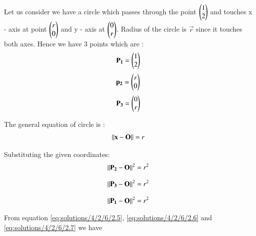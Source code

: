 Let us consider  we have a circle which passes through the point   $ \begin{pmatrix} 1 \\ 2 \\	\end{pmatrix} $  and touches  x - axis at point  $ \begin{pmatrix} r \\ 0 \\	\end{pmatrix} $ and y - axis  at $ \begin{pmatrix} 0 \\ r \\ \end{pmatrix} $. Radius of the circle is $\vec{r}$ since it touches both axes. Hence we have 3 points which are :
\begin{align}
\mathbf{P_{1}} = \begin{pmatrix} 1 \\ 2 \\\end{pmatrix}
\end{align}
\begin{align}
\mathbf{p_{2}} = \begin{pmatrix} r \\ 0 \\\end{pmatrix}
\end{align}
\begin{align}
\mathbf{P_{3}} = \begin{pmatrix} 0 \\ r \\\end{pmatrix} \label{eq:solutions/4/2/6/2.3}
\end{align}

The general equation of circle is :
\begin{align}
\left\lVert\mathbf{x} - \mathbf{O}\right\rVert = r
\end{align}

Substituting the given coordinates:
\begin{align}
\left\lVert  \mathbf{P_2} - \mathbf{O}\right\rVert^{2} = r^{2} \label{eq:solutions/4/2/6/2.5}
\end{align}

\begin{align}
\left\lVert  \mathbf{ P_3} - \mathbf{O}\right\rVert^{2} = r^{2} \label{eq:solutions/4/2/6/2.6}
\end{align}


\begin{align}
\left\lVert  \mathbf{ P_1} - \mathbf{O}\right\rVert^{2} = r^{2} \label{eq:solutions/4/2/6/2.7}
\end{align}

From equation \ref{eq:solutions/4/2/6/2.5}, \ref{eq:solutions/4/2/6/2.6} and \ref{eq:solutions/4/2/6/2.7} we have 
%
%




